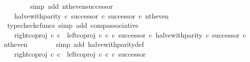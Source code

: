 \begin{isabellebody}
\ \ \ \ \ \ \isamarkupfalse%
\ {\isacharparenleft}{\kern0pt}simp\ add{\isacharcolon}{\kern0pt}\ nth{\isacharunderscore}{\kern0pt}even{\isacharunderscore}{\kern0pt}successor{\isacharparenright}{\kern0pt}\isanewline
\ \ \ \ \isamarkupfalse%
\ \isamarkupfalse%
\ {\isachardoublequoteopen}{\isachardot}{\kern0pt}{\isachardot}{\kern0pt}{\isachardot}{\kern0pt}\ {\isacharequal}{\kern0pt}\ {\isacharparenleft}{\kern0pt}{\isacharparenleft}{\kern0pt}halve{\isacharunderscore}{\kern0pt}with{\isacharunderscore}{\kern0pt}parity\ {\isasymcirc}\isactrlsub c\ successor{\isacharparenright}{\kern0pt}\ {\isasymcirc}\isactrlsub c\ successor{\isacharparenright}{\kern0pt}\ {\isasymcirc}\isactrlsub c\ nth{\isacharunderscore}{\kern0pt}even{\isachardoublequoteclose}\isanewline
\ \ \ \ \ \ \isamarkupfalse%
\ {\isacharparenleft}{\kern0pt}typecheck{\isacharunderscore}{\kern0pt}cfuncs{\isacharcomma}{\kern0pt}\ simp\ add{\isacharcolon}{\kern0pt}\ comp{\isacharunderscore}{\kern0pt}associative{}{\isacharparenright}{\kern0pt}\isanewline
\ \ \ \ \isamarkupfalse%
\ \isamarkupfalse%
\ {\isachardoublequoteopen}{\isachardot}{\kern0pt}{\isachardot}{\kern0pt}{\isachardot}{\kern0pt}\ {\isacharequal}{\kern0pt}\ {\isacharparenleft}{\kern0pt}{\isacharparenleft}{\kern0pt}{\isacharparenleft}{\kern0pt}right{\isacharunderscore}{\kern0pt}coproj\ {\isasymnat}\isactrlsub c\ {\isasymnat}\isactrlsub c\ {\isasymamalg}\ {\isacharparenleft}{\kern0pt}left{\isacharunderscore}{\kern0pt}coproj\ {\isasymnat}\isactrlsub c\ {\isasymnat}\isactrlsub c\ {\isasymcirc}\isactrlsub c\ successor{\isacharparenright}{\kern0pt}{\isacharparenright}{\kern0pt}\ {\isasymcirc}\isactrlsub c\ halve{\isacharunderscore}{\kern0pt}with{\isacharunderscore}{\kern0pt}parity{\isacharparenright}{\kern0pt}\ {\isasymcirc}\isactrlsub c\ successor{\isacharparenright}{\kern0pt}\ {\isasymcirc}\isactrlsub c\ nth{\isacharunderscore}{\kern0pt}even{\isachardoublequoteclose}\isanewline
\ \ \ \ \ \ \isamarkupfalse%
\ {\isacharparenleft}{\kern0pt}simp\ add{\isacharcolon}{\kern0pt}\ halve{\isacharunderscore}{\kern0pt}with{\isacharunderscore}{\kern0pt}parity{\isacharunderscore}{\kern0pt}def{}{\isacharparenright}{\kern0pt}\isanewline
\ \ \ \ \isamarkupfalse%
\ \isamarkupfalse%
\ {\isachardoublequoteopen}{\isachardot}{\kern0pt}{\isachardot}{\kern0pt}{\isachardot}{\kern0pt}\ {\isacharequal}{\kern0pt}\ {\isacharparenleft}{\kern0pt}right{\isacharunderscore}{\kern0pt}coproj\ {\isasymnat}\isactrlsub c\ {\isasymnat}\isactrlsub c\ {\isasymamalg}\ {\isacharparenleft}{\kern0pt}left{\isacharunderscore}{\kern0pt}coproj\ {\isasymnat}\isactrlsub c\ {\isasymnat}\isactrlsub c\ {\isasymcirc}\isactrlsub c\ successor{\isacharparenright}{\kern0pt}{\isacharparenright}{\kern0pt}\isanewline

\end{isabellebody}
